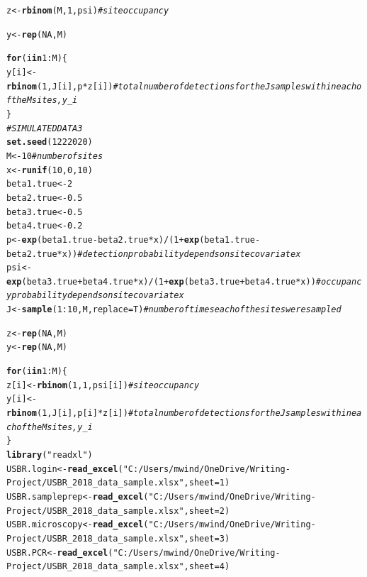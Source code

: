 \documentclass[12pt]{article}\usepackage[]{graphicx}\usepackage[]{color}
\makeatletter
\newcommand{\hlnum}[1]{\textcolor[rgb]{0.686,0.059,0.569}{#1}}%
\newcommand{\hlstr}[1]{\textcolor[rgb]{0.192,0.494,0.8}{#1}}%
\newcommand{\hlcom}[1]{\textcolor[rgb]{0.678,0.584,0.686}{\textit{#1}}}%
\newcommand{\hlopt}[1]{\textcolor[rgb]{0,0,0}{#1}}%
\newcommand{\hlstd}[1]{\textcolor[rgb]{0.345,0.345,0.345}{#1}}%
\newcommand{\hlkwa}[1]{\textcolor[rgb]{0.161,0.373,0.58}{\textbf{#1}}}%
\newcommand{\hlkwb}[1]{\textcolor[rgb]{0.69,0.353,0.396}{#1}}%
\newcommand{\hlkwc}[1]{\textcolor[rgb]{0.333,0.667,0.333}{#1}}%
\newcommand{\hlkwd}[1]{\textcolor[rgb]{0.737,0.353,0.396}{\textbf{#1}}}%
\newenvironment{kframe}{%
 \def\at@end@of@kframe{}%
 \ifinner\ifhmode%
  \def\at@end@of@kframe{\end{minipage}}%
  \begin{minipage}{\columnwidth}%
 \fi\fi%
 \def\FrameCommand##1{\hskip\@totalleftmargin \hskip-\fboxsep
 \colorbox{shadecolor}{##1}\hskip-\fboxsep
     \hskip-\linewidth \hskip-\@totalleftmargin \hskip\columnwidth}%
 \MakeFramed {\advance\hsize-\width
   \@totalleftmargin\z@ \linewidth\hsize
   \@setminipage}}%
 {\par\unskip\endMakeFramed%
 \at@end@of@kframe}
\newenvironment{knitrout}{}{} %
\newcommand{\hlnum}[1]{\textcolor[rgb]{0.686,0.059,0.569}{#1}}%
\newcommand{\hlstr}[1]{\textcolor[rgb]{0.192,0.494,0.8}{#1}}%
\newcommand{\hlcom}[1]{\textcolor[rgb]{0.678,0.584,0.686}{\textit{#1}}}%
\newcommand{\hlopt}[1]{\textcolor[rgb]{0,0,0}{#1}}%
\newcommand{\hlstd}[1]{\textcolor[rgb]{0.345,0.345,0.345}{#1}}%
\newcommand{\hlkwa}[1]{\textcolor[rgb]{0.161,0.373,0.58}{\textbf{#1}}}%
\newcommand{\hlkwb}[1]{\textcolor[rgb]{0.69,0.353,0.396}{#1}}%
\newcommand{\hlkwc}[1]{\textcolor[rgb]{0.333,0.667,0.333}{#1}}%
\newcommand{\hlkwd}[1]{\textcolor[rgb]{0.737,0.353,0.396}{\textbf{#1}}}%
\newenvironment{kframe}{%
 \def\at@end@of@kframe{}%
 \ifinner\ifhmode%
  \def\at@end@of@kframe{\end{minipage}}%
  \begin{minipage}{\columnwidth}%
 \fi\fi%
 \def\FrameCommand##1{\hskip\@totalleftmargin \hskip-\fboxsep
 \colorbox{shadecolor}{##1}\hskip-\fboxsep
     \hskip-\linewidth \hskip-\@totalleftmargin \hskip\columnwidth}%
 \MakeFramed {\advance\hsize-\width
   \@totalleftmargin\z@ \linewidth\hsize
   \@setminipage}}%
 {\par\unskip\endMakeFramed%
 \at@end@of@kframe}
\newenvironment{knitrout}{}{} %
\makeatother
\begin{document}
\begin{knitrout}
\begin{kframe}
\begin{alltt}
\hlstd{z} \hlkwb{<-} \hlkwd{rbinom}\hlstd{(M,} \hlnum{1}\hlstd{, psi)} \hlcom{# site occupancy}

\hlstd{y} \hlkwb{<-} \hlkwd{rep}\hlstd{(}\hlnum{NA}\hlstd{, M)}

\hlkwa{for}\hlstd{(i} \hlkwa{in} \hlnum{1}\hlopt{:}\hlstd{M)\{}
  \hlstd{y[i]} \hlkwb{<-} \hlkwd{rbinom}\hlstd{(}\hlnum{1}\hlstd{, J[i], p}\hlopt{*}\hlstd{z[i])} \hlcom{# total number of detections for the J samples within each of the M sites, y_i}
\hlstd{\}}
\hlcom{#SIMULATED DATA 3}
\hlkwd{set.seed}\hlstd{(}\hlnum{1222020}\hlstd{)}
\hlstd{M} \hlkwb{<-} \hlnum{10} \hlcom{# number of sites}
\hlstd{x} \hlkwb{<-} \hlkwd{runif}\hlstd{(}\hlnum{10}\hlstd{,} \hlnum{0}\hlstd{,} \hlnum{10}\hlstd{)}
\hlstd{beta1.true} \hlkwb{<-} \hlnum{2}
\hlstd{beta2.true} \hlkwb{<-} \hlnum{0.5}
\hlstd{beta3.true} \hlkwb{<-} \hlnum{0.5}
\hlstd{beta4.true} \hlkwb{<-} \hlnum{0.2}
\hlstd{p} \hlkwb{<-} \hlkwd{exp}\hlstd{(beta1.true} \hlopt{-} \hlstd{beta2.true}\hlopt{*}\hlstd{x)}\hlopt{/}\hlstd{(}\hlnum{1} \hlopt{+} \hlkwd{exp}\hlstd{(beta1.true} \hlopt{-} \hlstd{beta2.true}\hlopt{*}\hlstd{x))} \hlcom{# detection probability depends on site covariate x}
\hlstd{psi} \hlkwb{<-} \hlkwd{exp}\hlstd{(beta3.true} \hlopt{+} \hlstd{beta4.true}\hlopt{*}\hlstd{x)}\hlopt{/}\hlstd{(}\hlnum{1} \hlopt{+} \hlkwd{exp}\hlstd{(beta3.true} \hlopt{+} \hlstd{beta4.true}\hlopt{*}\hlstd{x))} \hlcom{# occupancy probability depends on site covariate x}
\hlstd{J} \hlkwb{<-} \hlkwd{sample}\hlstd{(}\hlnum{1}\hlopt{:}\hlnum{10}\hlstd{, M,} \hlkwc{replace} \hlstd{= T)} \hlcom{# number of times each of the sites were sampled}

\hlstd{z} \hlkwb{<-} \hlkwd{rep}\hlstd{(}\hlnum{NA}\hlstd{, M)}
\hlstd{y} \hlkwb{<-} \hlkwd{rep}\hlstd{(}\hlnum{NA}\hlstd{, M)}

\hlkwa{for}\hlstd{(i} \hlkwa{in} \hlnum{1}\hlopt{:}\hlstd{M)\{}
  \hlstd{z[i]} \hlkwb{<-} \hlkwd{rbinom}\hlstd{(}\hlnum{1}\hlstd{,} \hlnum{1}\hlstd{, psi[i])} \hlcom{#site occupancy}
  \hlstd{y[i]} \hlkwb{<-} \hlkwd{rbinom}\hlstd{(}\hlnum{1}\hlstd{, J[i], p[i]}\hlopt{*}\hlstd{z[i])} \hlcom{# total number of detections for the J samples within each of the M sites, y_i}
\hlstd{\}}
\hlkwd{library}\hlstd{(}\hlstr{"readxl"}\hlstd{)}
\hlstd{USBR.login} \hlkwb{<-} \hlkwd{read_excel}\hlstd{(}\hlstr{"C:/Users/mwind/OneDrive/Writing-Project/USBR_2018_data_sample.xlsx"}\hlstd{,} \hlkwc{sheet} \hlstd{=} \hlnum{1}\hlstd{)}
\hlstd{USBR.sampleprep} \hlkwb{<-} \hlkwd{read_excel}\hlstd{(}\hlstr{"C:/Users/mwind/OneDrive/Writing-Project/USBR_2018_data_sample.xlsx"}\hlstd{,} \hlkwc{sheet} \hlstd{=} \hlnum{2}\hlstd{)}
\hlstd{USBR.microscopy} \hlkwb{<-} \hlkwd{read_excel}\hlstd{(}\hlstr{"C:/Users/mwind/OneDrive/Writing-Project/USBR_2018_data_sample.xlsx"}\hlstd{,} \hlkwc{sheet} \hlstd{=} \hlnum{3}\hlstd{)}
\hlstd{USBR.PCR} \hlkwb{<-} \hlkwd{read_excel}\hlstd{(}\hlstr{"C:/Users/mwind/OneDrive/Writing-Project/USBR_2018_data_sample.xlsx"}\hlstd{,} \hlkwc{sheet} \hlstd{=} \hlnum{4}\hlstd{)}


\end{alltt}
\end{kframe}
\end{knitrout}
\end{document}
